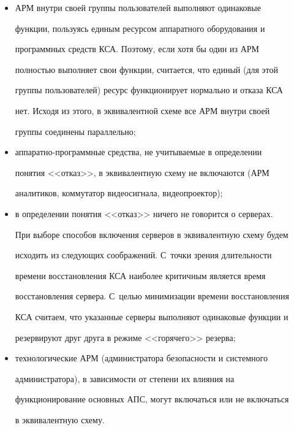      \begin{itemize} %


\item АРМ внутри своей группы пользователей выполняют одинаковые 


функции, пользуясь единым ресурсом аппаратного оборудования и 


программных средств КСА. Поэтому, если хотя бы один из АРМ 


полностью выполняет свои функции, считается, что единый (для этой 


группы пользователей) ресурс функционирует нормально и отказа КСА 


нет. Исходя из этого, в эквивалентной схеме все АРМ внутри своей 


группы соединены параллельно;


\item аппаратно-программные средства, не учитываемые в определении 


понятия <<отказ>>, в эквивалентную схему не включаются (АРМ 


аналитиков, коммутатор видеосигнала, видеопроектор);


\item в определении понятия <<отказ>> ничего не говорится о серверах. 


При выборе способов включения серверов в эквивалентную схему будем 


исходить из следующих соображений. С~точки зрения длительности 


времени восстановления КСА наиболее критичным является время 


восстановления сервера. С~целью минимизации времени восстановления 


КСА считаем, что указанные серверы выполняют одинаковые функции и 


резервируют друг друга в режиме <<горячего>> резерва;


\item технологические АРМ (администратора безопасности и системного 


администратора), в зависимости от степени их влияния на 


функционирование основных АПС, могут включаться или не включаться 


в эквивалентную \mbox{схему}.


\end{itemize}





